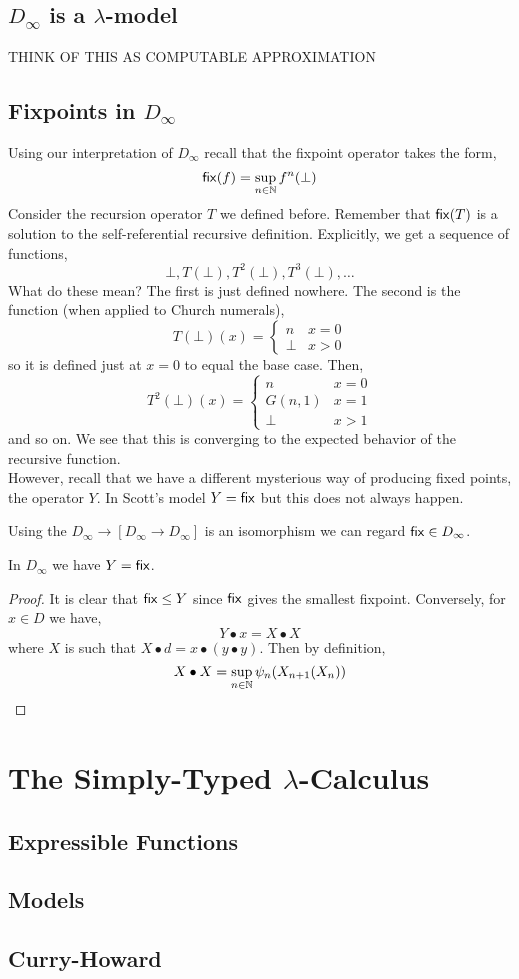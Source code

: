 \documentclass[12pt]{article}
\begin{document}
\subsection{$D_\infty$ is a $\lambda$-model}

THINK OF THIS AS COMPUTABLE APPROXIMATION

\subsection{Fixpoints in $D_{\infty}$}

Using our interpretation of $D_{\infty}$ recall that the fixpoint operator takes the form,
\[ \mathsf{fix}(f) = \sup_{n \in \mathbb{N}} f^n(\bot) \]
Consider the recursion operator $T$ we defined before. Remember that $\mathsf{fix}(T)$ is a solution to the self-referential recursive definition. Explicitly, we get a sequence of functions,
\[ \bot, T(\bot), T^2(\bot), T^3(\bot), \dots \]
What do these mean? The first is just defined nowhere. The second is the function (when applied to Church numerals),
\[ T(\bot)(x) = \begin{cases}
n & x = 0
\\
\bot & x > 0
\end{cases} \]
so it is defined just at $x = 0$ to equal the base case. Then,
\[  T^2(\bot)(x) = 
\begin{cases}
n & x = 0
\\
G(n, 1) & x = 1
\\
\bot & x > 1
\end{cases}
\]
and so on. We see that this is converging to the expected behavior of the recursive function. 
\bigskip\\
However, recall that we have a different mysterious way of producing fixed points, the operator $Y$. In Scott's model $Y = \mathsf{fix}$ but this does not always happen.

\begin{rmk}
Using the $D_{\infty} \to [D_{\infty} \to D_{\infty}]$ is an isomorphism we can regard $\mathsf{fix} \in D_{\infty}$. 
\end{rmk}

\begin{prop}
In $D_{\infty}$ we have $Y = \mathsf{fix}$.
\end{prop}

\begin{proof}
It is clear that $\mathsf{fix} \le Y$ since $\mathsf{fix}$ gives the smallest fixpoint. Conversely, for $x \in D$ we have,
\[ Y \bullet x = X \bullet X \]
where $X$ is such that $X \bullet d = x \bullet (y \bullet y)$. Then by definition,
\[ X \bullet X = \sup_{n \in \mathbb{N}} \psi_n(X_{n+1}(X_n)) \]
\end{proof}

\section{The Simply-Typed $\lambda$-Calculus}

\subsection{Expressible Functions}

\subsection{Models}

\subsection{Curry-Howard}
\end{document}
